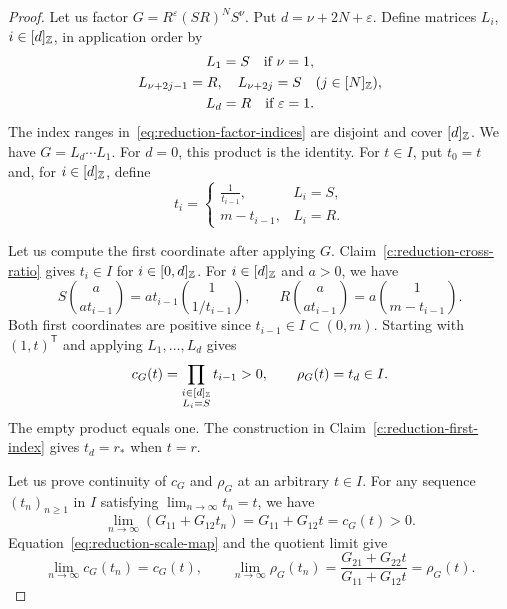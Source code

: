 \begin{proof}
 Let us factor $G=R^\varepsilon(SR)^N S^\nu$. Put $d=\nu+2N+\varepsilon$. Define matrices $L_i$, $i\in[d]_{\mathbb Z}$, in application order by
\begin{equation}\label{eq:reduction-factor-indices}
 \begin{gathered}
 L_1=S\quad\text{if }\nu=1,\\
 L_{\nu+2j-1}=R,\quad L_{\nu+2j}=S\quad(j\in[N]_{\mathbb Z}),\\
 L_d=R\quad\text{if }\varepsilon=1.
 \end{gathered}
\end{equation}
The index ranges in~\eqref{eq:reduction-factor-indices} are disjoint and cover $[d]_{\mathbb Z}$. We have $G=L_d\cdots L_1$. For $d=0$, this product is the identity. For $t\in I$, put $t_0=t$ and, for $i\in[d]_{\mathbb Z}$, define
\[
 t_i=\begin{cases}\frac1{t_{i-1}},&L_i=S,\\m-t_{i-1},&L_i=R.\end{cases}
\]

Let us compute the first coordinate after applying $G$.
Claim~\ref{c:reduction-cross-ratio} gives $t_i\in I$ for $i\in[0,d]_{\mathbb Z}$.
For $i\in[d]_{\mathbb Z}$ and $a>0$, we have
\[
 S\binom{a}{at_{i-1}}=at_{i-1}\binom{1}{1/t_{i-1}},\qquad
 R\binom{a}{at_{i-1}}=a\binom{1}{m-t_{i-1}}.
\]
Both first coordinates are positive since $t_{i-1}\in I\subset(0,m)$.
Starting with $(1,t)^{\mathsf T}$ and applying $L_1,\ldots,L_d$ gives
\[
 c_G(t)=\prod_{\substack{i\in[d]_{\mathbb Z}\\L_i=S}}t_{i-1}>0,
 \qquad \rho_G(t)=t_d\in I.
\]
The empty product equals one.
The construction in Claim~\ref{c:reduction-first-index} gives $t_d=r_*$ when $t=r$.

Let us prove continuity of $c_G$ and $\rho_G$ at an arbitrary $t\in I$.
For any sequence $(t_n)_{n\ge1}$ in $I$ satisfying $\lim_{n\to\infty}t_n=t$, we have
\[
 \lim_{n\to\infty}(G_{11}+G_{12}t_n)=G_{11}+G_{12}t=c_G(t)>0.
\]
Equation~\eqref{eq:reduction-scale-map} and the quotient limit give
\[
 \lim_{n\to\infty}c_G(t_n)=c_G(t),\qquad
 \lim_{n\to\infty}\rho_G(t_n)
 =\frac{G_{21}+G_{22}t}{G_{11}+G_{12}t}=\rho_G(t).
\]


\end{proof}
